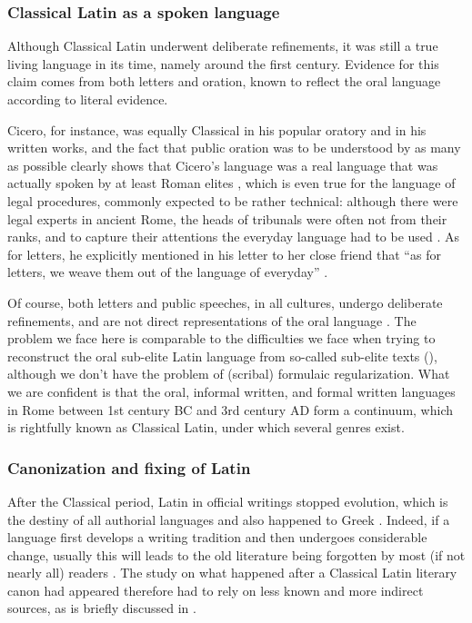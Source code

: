 \documentclass[a4paper, oneside, 12pt]{report}
\newcommand*{\citepage}[1]{p.~{#1}}
\newcommand*{\citepages}[1]{pp.~{#1}}
\begin{document}
\subsubsection{Classical Latin as a spoken language}

Although Classical Latin underwent deliberate refinements,
it was still a true living language in its time,
namely around the first century.
Evidence for this claim comes from both letters and oration,
known to reflect the oral language according to literal evidence.

Cicero, for instance, was equally Classical in his popular oratory and in his written works,
and the fact that public oration was to be understood by as many as possible
clearly shows that Cicero's language was a real language that was actually spoken 
by at least Roman elites
\citep[\citepage{71}]{leonhardt2013latin},
which is even true for the language of legal procedures,
commonly expected to be rather technical:
although there were legal experts in ancient Rome,
the heads of tribunals were often not from their ranks,
and to capture their attentions the everyday language had to be used
\citep[\citepages{385-386,464-465}]{clackson2011companion}.
As for letters, he explicitly mentioned in his letter to her close friend that 
``as for letters, we weave them out of the language of everyday''
\citep[\citepage{428}]{clackson2011companion}.

Of course, both letters and public speeches, in all cultures, undergo deliberate refinements,
and are not direct representations of the oral language
\citep[\citepages{397-399,434-438}]{clackson2011companion}.
The problem we face here is comparable to the difficulties we face
when trying to reconstruct the oral sub-elite Latin language
from so-called sub-elite texts (),
although we don't have the problem of (scribal) formulaic regularization.
What we are confident is that the oral, informal written, and formal written languages in Rome
between 1st century BC and 3rd century AD form a continuum,
which is rightfully known as Classical Latin,
under which several genres exist.

\subsubsection{Canonization and fixing of Latin}

After the Classical period,
Latin in official writings stopped evolution,
which is the destiny of all authorial languages
and also happened to Greek \citep[\citepages{71-72}]{leonhardt2013latin}.
Indeed, if a language first develops a writing tradition
and then undergoes considerable change,
usually this will leads to the old literature being forgotten by most (if not nearly all) readers
\citep[\citepage{144}]{leonhardt2013latin}. 
The study on what happened after a Classical Latin literary canon had appeared
therefore had to rely on less known and more indirect sources,
as is briefly discussed in .
\end{document}
